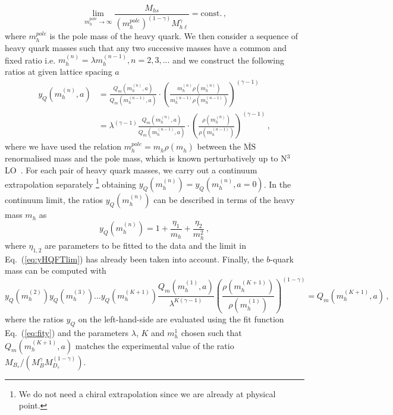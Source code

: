 \begin{equation}
  \lim_{ m^{pole}_h\to \infty}
  \frac{M_{hs}}{( m^{pole}_h)^{(1-\gamma)} M_{h\ell}^\gamma}=\mbox{const.}\,,
  \label{eq:yHQFTlim}
\end{equation}
where $ m^{pole}_h$ is the pole mass of the heavy quark.
We then consider a sequence of heavy quark masses such that any two
successive masses have a common and fixed ratio i.e.
$ m_h^{(n)}=\lambda m_h^{(n-1)}, n=2,3,...$ and we construct the
following ratios at given lattice spacing $a$
\begin{equation}
  \begin{split}
    y_Q( m^{(n)}_h,a)&=\frac{Q_m( m_h^{(n)},a)}{Q_m( m_h^{(n-1)},a)}\cdot
    \left(\frac{ m_{h}^{(n)} \rho( m_{h}^{(n)})}{ m_{h}^{(n-1)}\rho( m_{h}^{(n-1)})}\right)^{(\gamma-1)}\\
    &=\lambda^{(\gamma-1)}\frac{Q_m( m_h^{(n)},a)}{Q_m( m_h^{(n-1)},a)}\cdot
    \left(\frac{ \rho( m_{h}^{(n)})}{\rho(
      m_{h}^{(n-1)})}\right)^{(\gamma-1)}\,,
  \end{split}
\end{equation}
where we have used the relation  $ m^{pole}_h= m_{h}^{} \rho( m_{h}^{})$
between the $\overline{\mbox{MS}}$ renormalised mass and the pole
mass, which is known perturbatively up to N$^3$LO~\cite{Chetyrkin:1999pq}.
For each pair of heavy quark masses, we carry out a continuum
extrapolation separately
\footnote{We do not need a chiral extrapolation since we are already at physical point.}
obtaining $y_Q( m^{(n)}_h)=y_Q( m^{(n)}_h,a=0)$.
In the continuum limit, the ratios $y_Q( m^{(n)}_h)$ can be described
in terms of the heavy mass $m_h$ as~\cite{ETM:2011zey}
\begin{equation}
  y_Q( m^{(n)}_h) = 1 + \frac{\eta_1}{ m_h}+ \frac{\eta_2}{ m_h^2}\,,
  \label{eq:fity}
\end{equation}
where $\eta_{1,2}$ are parameters to be fitted to the data and the limit in
Eq.~(\ref{eq:yHQFTlim}) has already been taken into account.
Finally, the $b$-quark mass can be computed with
\begin{equation}
  y_Q( m^{(2)}_h)y_Q( m^{(3)}_h)...y_Q( m^{(K+1)}_h)\frac{Q_m( m_h^{(1)},a)}{\lambda^{K(\gamma-1)}}
  \left(\frac{ \rho( m_{h}^{(K+1)})}{\rho( m_{h}^{(1)})}\right)^{(1-\gamma)}=Q_m( m_h^{(K+1)},a)
  \,,
\end{equation}
where the ratios $y_Q$ on the left-hand-side are evaluated using the
fit function Eq.~(\ref{eq:fity}) and the parameters $\lambda$, $K$ and
$ m_h^1$ chosen such that $Q_m( m_h^{(K+1)},a)$ matches 
the experimental value of the ratio $M_{B_s}/(M_{B}^\gamma M_{D_s}^{(1-\gamma)})$.


\endinput
